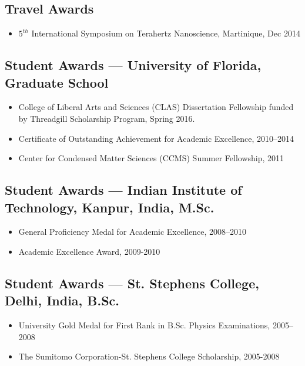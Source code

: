 \documentclass[11pt]{article}
\begin{document}
\subsection*{Travel Awards}
\begin{itemize}
\item $5^{th}$ International Symposium on Terahertz Nanoscience, Martinique, Dec 2014
\end{itemize}

\subsection*{ Student Awards --- University of Florida, Graduate School}
\begin{itemize}
\item College of Liberal Arts and Sciences (CLAS) Dissertation Fellowship funded by Threadgill Scholarship Program, Spring 2016.
\item Certificate of Outstanding Achievement for Academic Excellence, 2010--2014
\item Center for Condensed Matter Sciences (CCMS) Summer Fellowship, 2011
\end{itemize}

\subsection*{Student Awards --- Indian Institute of Technology, Kanpur, India, M.Sc.}
\begin{itemize}
\item  General Proficiency Medal for Academic Excellence, 2008--2010
\item Academic Excellence Award, 2009-2010
\end{itemize}

\subsection*{Student Awards --- St. Stephens College, Delhi, India, B.Sc.}
\begin{itemize}
\item University Gold Medal for First Rank in B.Sc. Physics Examinations, 2005--2008
\item The Sumitomo Corporation-St. Stephens College Scholarship, 2005-2008
\end{itemize}
\end{document}
